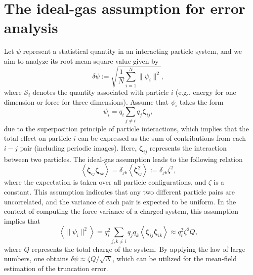  \section{The ideal-gas assumption for error analysis}\label{app::ideal-gas}
 Let $\bm{\mathcal{\psi}}$ represent a statistical quantity in an interacting particle system, and we aim to analyze its root mean square value given by
 \begin{equation}\label{eq::deltaS}
 	\delta \bm{\mathcal{\psi}}:=\sqrt{\frac{1}{N}\sum_{i=1}^{N}\|\bm{\mathcal{\psi}}_{i}\|^2},
 \end{equation}
 where $\bm{\mathcal{S}}_{i}$ denotes the quantity associated with particle $i$ (e.g., energy for one dimension or force for three dimensions). Assume that $\bm{\mathcal{\psi}}_{i}$ takes the form
\begin{equation}
	\bm{\mathcal{\psi}}_{i}=q_{i} \sum_{j \neq i} q_{j} \bm{\zeta}_{i j},
\end{equation}
due to the superposition principle of particle interactions, which implies that the total effect on particle $i$ can be expressed as the sum of contributions from each $i-j$ pair (including periodic images). Here, $\bm{\zeta}_{i j}$ represents the interaction between two particles. The ideal-gas assumption leads to the following relation
\begin{equation}
	\left\langle\boldsymbol{\zeta}_{i j} \boldsymbol{\zeta}_{i k}\right\rangle=\delta_{j k}\left\langle\boldsymbol{\zeta}_{i j}^2\right\rangle:=\delta_{j k} \zeta^2,
\end{equation}
where the expectation is taken over all particle configurations, and $\zeta$ is a constant. This assumption indicates that any two different particle pairs are uncorrelated, and the variance of each pair is expected to be uniform. In the context of computing the force variance of a charged system, this assumption implies that
\begin{equation}
	\left\langle\|\bm{\mathcal{\psi}}_{i}\|^2\right\rangle=q_{i}^2 \sum_{j, k \neq i} q_{j} q_k\left\langle\boldsymbol{\zeta}_{i j} \boldsymbol{\zeta}_{i k}\right\rangle \approx q_{i}^2 \zeta^2 Q,
\end{equation}
where $Q$ represents the total charge of the system. By applying the law of large numbers, one obtains $\delta\mathcal{\psi}\approx \zeta Q/\sqrt{N}$, which can be utilized for the mean-field estimation of the truncation error.

